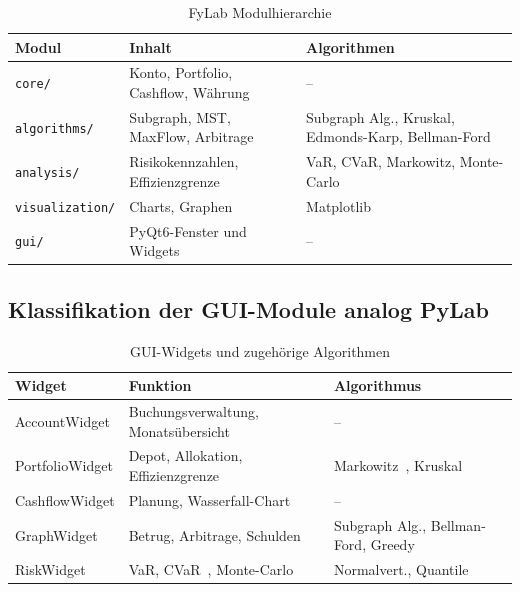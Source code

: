 \documentclass[a4paper,12pt]{article}
\begin{document}
\begin{table}
    \centering
    \begin{tabular}{@{}lll@{}}
        \toprule
        \textbf{Modul} & \textbf{Inhalt} & \textbf{Algorithmen} \\
        \midrule
        \texttt{core/}         & Konto, Portfolio, Cashflow, Währung
                               & -- \\
        \texttt{algorithms/}   & Subgraph, MST, MaxFlow, Arbitrage
                               & Subgraph Alg., Kruskal, Edmonds-Karp, Bellman-Ford \\
        \texttt{analysis/}     & Risikokennzahlen, Effizienzgrenze
                               & VaR, CVaR, Markowitz, Monte-Carlo \\
        \texttt{visualization/}& Charts, Graphen
                               & Matplotlib~\cite{hunter2007} \\
        \texttt{gui/}          & PyQt6-Fenster und Widgets
                               & -- \\
        \bottomrule
    \end{tabular}
    \caption{FyLab Modulhierarchie}
\end{table}

\subsection{Klassifikation der GUI-Module analog PyLab}

\begin{table}
    \centering
    \begin{tabular}{@{}lll@{}}
        \toprule
        \textbf{Widget} & \textbf{Funktion} & \textbf{Algorithmus} \\
        \midrule
        AccountWidget    & Buchungsverwaltung, Monatsübersicht & -- \\
        PortfolioWidget  & Depot, Allokation, Effizienzgrenze & Markowitz~\cite{markowitz1952}, Kruskal~\cite{kruskal1956} \\
        CashflowWidget   & Planung, Wasserfall-Chart & -- \\
        GraphWidget      & Betrug, Arbitrage, Schulden
                         & Subgraph Alg., Bellman-Ford, Greedy \\
        RiskWidget       & VaR, CVaR~\cite{rockafellar2000}, Monte-Carlo & Normalvert., Quantile~\cite{sharpe1964} \\
        \bottomrule
    \end{tabular}
    \caption{GUI-Widgets und zugehörige Algorithmen}
\end{table}
\end{document}
